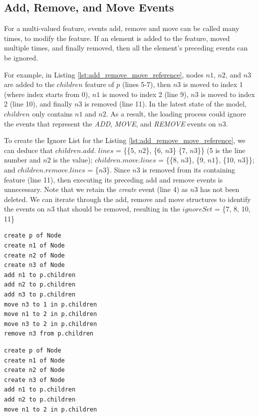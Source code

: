 \documentclass{llncs}
\begin{document}
    \subsection{Add, Remove, and Move Events}\label{subsec:add_remove_and_move_operations}
    For a multi-valued feature, events add, remove and move can be called many times, to modify the feature. If an element is added to the feature, moved multiple times, and finally removed, then all the element's preceding events can be ignored. 
    
    For example, in Listing \ref{lst:add_remove_move_reference},  nodes $n1$, $n2$, and $n3$ are added to the $children$ feature of $p$ (lines 5-7), then $n3$ is moved to index 1 (where index starts from 0), $n1$ is moved to index 2 (line 9), $n3$ is moved to index 2 (line 10), and finally $n3$ is removed (line 11).  In the latest state of the model, $children$ only contains $n1$ and $n2$. As a result, the loading process could ignore the events that represent the \textit{ADD}, \textit{MOVE}, and \textit{REMOVE} events on $n3$. 
    
    To create the Ignore List for the Listing \ref{lst:add_remove_move_reference}, we can deduce that $children$.$add$. $lines$ = \{\{5, $n2$\}, \{6, $n3$\} \{7, $n3$\}\} (5 is the line number and $n2$ is the value); $children$.$move$.$lines$ = \{\{8, $n3$\}, \{9, $n1$\}, \{10, $n3$\}\}; and $children$.$remove$.$lines$ = \{$n$3\}. Since $n3$ is removed from its containing feature (line 11), then executing its preceding add and remove events is unnecessary. Note that we retain the \textit{create} event (line 4) as $n3$ has not been deleted.  We can iterate through the add, remove and move structures to identify the events on $n3$ that should be removed, resulting in the $ignoreSet$ = \{7, 8, 10, 11\}
    
\noindent
    \begin{minipage}[t]{0.48\linewidth}
\begin{lstlisting}[style=eol,caption={A CBP representation of add, move, and remove operations.},label=lst:add_remove_move_reference]
create p of Node
create n1 of Node
create n2 of Node
create n3 of Node
add n1 to p.children
add n2 to p.children
add n3 to p.children
move n3 to 1 in p.children  
move n1 to 2 in p.children  
move n3 to 2 in p.children
remove n3 from p.children   
\end{lstlisting}
    \end{minipage}
    \hfill
    \begin{minipage}[t]{0.48\linewidth}
\begin{lstlisting}[style=eol,caption={The optimised CBP representation of Listing \ref{lst:add_remove_move_reference}},label=lst:optimised_add_remove_move_reference]
create p of Node
create n1 of Node
create n2 of Node
create n3 of Node
add n1 to p.children
add n2 to p.children  
move n1 to 2 in p.children
\end{lstlisting}
    \end{minipage}
    
\end{document}
